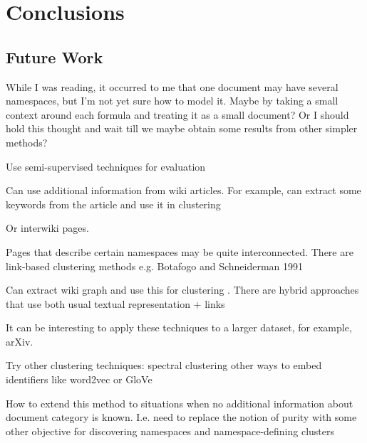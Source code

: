 \section{Conclusions}


\subsection{Future Work}


While I was reading, it occurred to me that one document may have several namespaces, but I'm not yet sure how to model it. Maybe by taking a small context around each formula and treating it as a small document? Or I should hold this thought and wait till we maybe obtain some results from other simpler methods?



Use semi-supervised techniques for evaluation


Can use additional information from wiki articles. For example, can 
extract some keywords from the article and use it in clustering

Or interwiki pages.

Pages that describe certain namespaces may be quite interconnected.
There are link-based clustering methods e.g. Botafogo and Schneiderman 1991

Can extract wiki graph and use this for clustering .
There are hybrid approaches that use both usual textual representation  + links
\cite{oikonomakou2005review}


It can be interesting to apply these techniques to a larger dataset, for example, arXiv.

Try other clustering techniques: spectral clustering \cite{ng2002spectral}
other ways to embed identifiers like word2vec \cite{mikolov2013efficient} 
or GloVe \cite{pennington2014glove}


How to extend this method to situations when no additional information 
about document category is known. I.e. need to replace the notion of 
purity with some other objective for discovering namespaces and 
namespace-defining clusters

